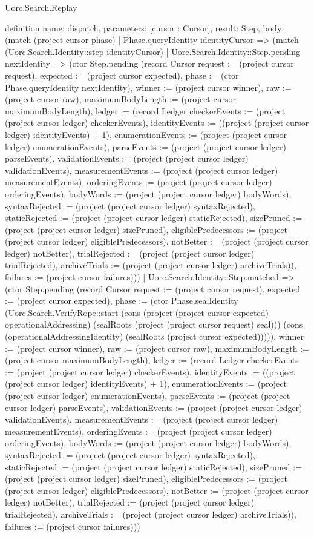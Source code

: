 \begin{lexlean}{Uorc.Search.Replay}
\begin{semanticmodule}
definition{
  name: dispatch,
  parameters: [cursor : Cursor],
  result: Step,
  body: (match (project cursor phase)
    | Phase.queryIdentity identityCursor => (match (Uorc.Search.Identity::step identityCursor)
      | Uorc.Search.Identity::Step.pending nextIdentity => (ctor Step.pending (record Cursor {request := (project cursor request), expected := (project cursor expected), phase := (ctor Phase.queryIdentity nextIdentity), winner := (project cursor winner), raw := (project cursor raw), maximumBodyLength := (project cursor maximumBodyLength), ledger := (record Ledger {checkerEvents := (project (project cursor ledger) checkerEvents), identityEvents := ((project (project cursor ledger) identityEvents) + 1), enumerationEvents := (project (project cursor ledger) enumerationEvents), parseEvents := (project (project cursor ledger) parseEvents), validationEvents := (project (project cursor ledger) validationEvents), measurementEvents := (project (project cursor ledger) measurementEvents), orderingEvents := (project (project cursor ledger) orderingEvents), bodyWords := (project (project cursor ledger) bodyWords), syntaxRejected := (project (project cursor ledger) syntaxRejected), staticRejected := (project (project cursor ledger) staticRejected), sizePruned := (project (project cursor ledger) sizePruned), eligiblePredecessors := (project (project cursor ledger) eligiblePredecessors), notBetter := (project (project cursor ledger) notBetter), trialRejected := (project (project cursor ledger) trialRejected), archiveTrials := (project (project cursor ledger) archiveTrials)}), failures := (project cursor failures)}))
      | Uorc.Search.Identity::Step.matched => (ctor Step.pending (record Cursor {request := (project cursor request), expected := (project cursor expected), phase := (ctor Phase.sealIdentity (Uorc.Search.VerifyRope::start (cons (project (project cursor expected) operationalAddressing) (sealRoots (project (project cursor request) seal))) (cons (operationalAddressingIdentity) (sealRoots (project cursor expected))))), winner := (project cursor winner), raw := (project cursor raw), maximumBodyLength := (project cursor maximumBodyLength), ledger := (record Ledger {checkerEvents := (project (project cursor ledger) checkerEvents), identityEvents := ((project (project cursor ledger) identityEvents) + 1), enumerationEvents := (project (project cursor ledger) enumerationEvents), parseEvents := (project (project cursor ledger) parseEvents), validationEvents := (project (project cursor ledger) validationEvents), measurementEvents := (project (project cursor ledger) measurementEvents), orderingEvents := (project (project cursor ledger) orderingEvents), bodyWords := (project (project cursor ledger) bodyWords), syntaxRejected := (project (project cursor ledger) syntaxRejected), staticRejected := (project (project cursor ledger) staticRejected), sizePruned := (project (project cursor ledger) sizePruned), eligiblePredecessors := (project (project cursor ledger) eligiblePredecessors), notBetter := (project (project cursor ledger) notBetter), trialRejected := (project (project cursor ledger) trialRejected), archiveTrials := (project (project cursor ledger) archiveTrials)}), failures := (project cursor failures)}))
}
\end{semanticmodule}
\end{lexlean}
